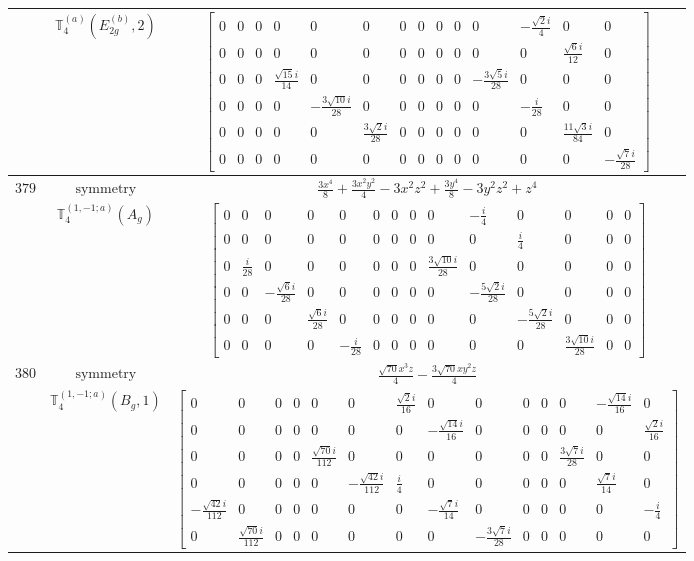 \documentclass[fleqn,8pt,landscape]{jsarticle}
\begin{document}
\begin{longtable}{ccc}
$  $ & $ \mathbb{T}_{4}^{(a)}(E_{2g}^{(b)},2) $ & $ \begin{bmatrix} 0 & 0 & 0 & 0 & 0 & 0 & 0 & 0 & 0 & 0 & 0 & - \frac{\sqrt{2} i}{4} & 0 & 0 \\ 0 & 0 & 0 & 0 & 0 & 0 & 0 & 0 & 0 & 0 & 0 & 0 & \frac{\sqrt{6} i}{12} & 0 \\ 0 & 0 & 0 & \frac{\sqrt{15} i}{14} & 0 & 0 & 0 & 0 & 0 & 0 & - \frac{3 \sqrt{5} i}{28} & 0 & 0 & 0 \\ 0 & 0 & 0 & 0 & - \frac{3 \sqrt{10} i}{28} & 0 & 0 & 0 & 0 & 0 & 0 & - \frac{i}{28} & 0 & 0 \\ 0 & 0 & 0 & 0 & 0 & \frac{3 \sqrt{2} i}{28} & 0 & 0 & 0 & 0 & 0 & 0 & \frac{11 \sqrt{3} i}{84} & 0 \\ 0 & 0 & 0 & 0 & 0 & 0 & 0 & 0 & 0 & 0 & 0 & 0 & 0 & - \frac{\sqrt{7} i}{28} \end{bmatrix} $ \\ \hline
$ 379 $ & $ \text{symmetry} $ & $ \frac{3 x^{4}}{8} + \frac{3 x^{2} y^{2}}{4} - 3 x^{2} z^{2} + \frac{3 y^{4}}{8} - 3 y^{2} z^{2} + z^{4} $ \\
$  $ & $ \mathbb{T}_{4}^{(1,-1;a)}(A_{g}) $ & $ \begin{bmatrix} 0 & 0 & 0 & 0 & 0 & 0 & 0 & 0 & 0 & - \frac{i}{4} & 0 & 0 & 0 & 0 \\ 0 & 0 & 0 & 0 & 0 & 0 & 0 & 0 & 0 & 0 & \frac{i}{4} & 0 & 0 & 0 \\ 0 & \frac{i}{28} & 0 & 0 & 0 & 0 & 0 & 0 & \frac{3 \sqrt{10} i}{28} & 0 & 0 & 0 & 0 & 0 \\ 0 & 0 & - \frac{\sqrt{6} i}{28} & 0 & 0 & 0 & 0 & 0 & 0 & - \frac{5 \sqrt{2} i}{28} & 0 & 0 & 0 & 0 \\ 0 & 0 & 0 & \frac{\sqrt{6} i}{28} & 0 & 0 & 0 & 0 & 0 & 0 & - \frac{5 \sqrt{2} i}{28} & 0 & 0 & 0 \\ 0 & 0 & 0 & 0 & - \frac{i}{28} & 0 & 0 & 0 & 0 & 0 & 0 & \frac{3 \sqrt{10} i}{28} & 0 & 0 \end{bmatrix} $ \\ \hline
$ 380 $ & $ \text{symmetry} $ & $ \frac{\sqrt{70} x^{3} z}{4} - \frac{3 \sqrt{70} x y^{2} z}{4} $ \\
$  $ & $ \mathbb{T}_{4}^{(1,-1;a)}(B_{g},1) $ & $ \begin{bmatrix} 0 & 0 & 0 & 0 & 0 & 0 & \frac{\sqrt{2} i}{16} & 0 & 0 & 0 & 0 & 0 & - \frac{\sqrt{14} i}{16} & 0 \\ 0 & 0 & 0 & 0 & 0 & 0 & 0 & - \frac{\sqrt{14} i}{16} & 0 & 0 & 0 & 0 & 0 & \frac{\sqrt{2} i}{16} \\ 0 & 0 & 0 & 0 & \frac{\sqrt{70} i}{112} & 0 & 0 & 0 & 0 & 0 & 0 & \frac{3 \sqrt{7} i}{28} & 0 & 0 \\ 0 & 0 & 0 & 0 & 0 & - \frac{\sqrt{42} i}{112} & \frac{i}{4} & 0 & 0 & 0 & 0 & 0 & \frac{\sqrt{7} i}{14} & 0 \\ - \frac{\sqrt{42} i}{112} & 0 & 0 & 0 & 0 & 0 & 0 & - \frac{\sqrt{7} i}{14} & 0 & 0 & 0 & 0 & 0 & - \frac{i}{4} \\ 0 & \frac{\sqrt{70} i}{112} & 0 & 0 & 0 & 0 & 0 & 0 & - \frac{3 \sqrt{7} i}{28} & 0 & 0 & 0 & 0 & 0 \end{bmatrix} $ \\ \hline

\end{longtable}
\end{document}
